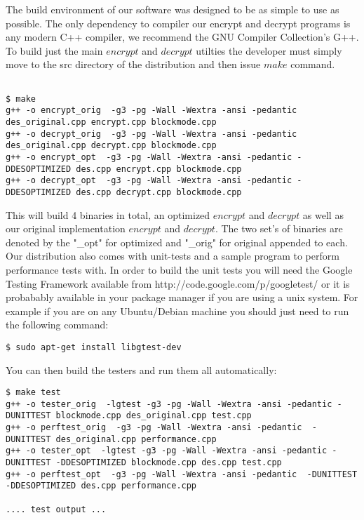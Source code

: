 \documentclass[10pt]{article}
\begin{document}
\indent  The build environment of our software was designed to be as simple to use as possible.
  The only dependency to compiler our encrypt and decrypt programs is any modern C++ compiler, we recommend the GNU Compiler Collection's G++.
  To build just the main $encrypt$ and $decrypt$ utilties the developer must simply move to the src directory of the distribution and then issue $make$ command.

{\footnotesize
\begin{verbatim}

$ make
g++ -o encrypt_orig  -g3 -pg -Wall -Wextra -ansi -pedantic des_original.cpp encrypt.cpp blockmode.cpp
g++ -o decrypt_orig  -g3 -pg -Wall -Wextra -ansi -pedantic des_original.cpp decrypt.cpp blockmode.cpp
g++ -o encrypt_opt  -g3 -pg -Wall -Wextra -ansi -pedantic -DDESOPTIMIZED des.cpp encrypt.cpp blockmode.cpp
g++ -o decrypt_opt  -g3 -pg -Wall -Wextra -ansi -pedantic -DDESOPTIMIZED des.cpp decrypt.cpp blockmode.cpp

\end{verbatim}
}
\noindent  This will build 4 binaries in total, an optimized $encrypt$ and $decrypt$ as well as our original implementation $encrypt$ and $decrypt$.
  The two set's of binaries are denoted by the "\_opt" for optimized and "\_orig" for original appended to each.
  Our distribution also comes with unit-tests and a sample program to perform performance tests with.
  In order to build the unit tests you will need the Google Testing Framework available from http://code.google.com/p/googletest/ or it is
  probabably available in your package manager if you are using a unix system. For example if you are on any Ubuntu/Debian machine you should just need to run the following command:
{\footnotesize
\begin{verbatim}
$ sudo apt-get install libgtest-dev
\end{verbatim}
}
\noindent You can then build the testers and run them all automatically:
{\footnotesize
\begin{verbatim}
$ make test
g++ -o tester_orig  -lgtest -g3 -pg -Wall -Wextra -ansi -pedantic -DUNITTEST blockmode.cpp des_original.cpp test.cpp
g++ -o perftest_orig  -g3 -pg -Wall -Wextra -ansi -pedantic  -DUNITTEST des_original.cpp performance.cpp
g++ -o tester_opt  -lgtest -g3 -pg -Wall -Wextra -ansi -pedantic -DUNITTEST -DDESOPTIMIZED blockmode.cpp des.cpp test.cpp
g++ -o perftest_opt  -g3 -pg -Wall -Wextra -ansi -pedantic  -DUNITTEST -DDESOPTIMIZED des.cpp performance.cpp

.... test output ...
\end{verbatim}
}
\end{document}
